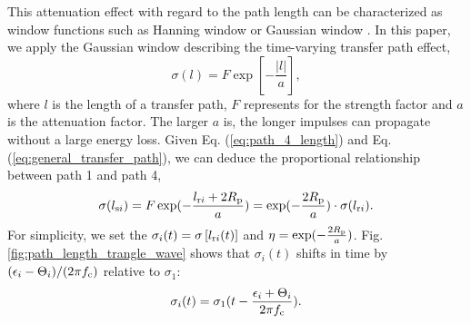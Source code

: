 \documentclass[a4paper,fleqn]{cas-sc}%
\begin{document}
\par This attenuation effect with regard to the path length can be characterized as window functions such as Hanning window or Gaussian window \cite{Mark2009}. In this paper, we apply the Gaussian window describing the time-varying transfer path effect,
\begin{equation}
    \sigma(l)=F\exp\left[-\frac{\left|l\right|}{a}\right],\label{eq:general_transfer_path}
\end{equation}
where $l$ is the length of a transfer path, $F$ represents for the strength factor and $a$ is the attenuation factor. The larger $a$ is, the longer impulses can propagate without a large energy loss. Given Eq. (\ref{eq:path_4_length}) and Eq. (\ref{eq:general_transfer_path}), we can deduce the proportional relationship between path 1 and path 4,
\begin{equation}
    \sigma (l_{{\rm s}i})=F\exp(-\frac{l_{{\rm r}i}+2 R_{\rm p}}{a})=\exp(-\frac{2 R_{\rm p}}{a}) \cdot \sigma(l_{{\rm r}i}).
\end{equation}
For simplicity, we set the $\sigma_i(t)=\sigma\left[l_{{\rm r}i}(t)\right]$ and $\eta=\exp(-\frac{2 R_{\rm p}}{a})$. Fig. \ref{fig:path_length_trangle_wave} shows that $\sigma_{i}(t)$ shifts in time by $(\epsilon_i-\Theta_i)/(2 \pi f_{\rm c})$ relative to $\sigma_1$:
\begin{equation}
    \sigma_{i}(t)=\sigma_{1}(t-\frac{\epsilon_i+\Theta_i}{2 \pi f_{\rm c}}).
\end{equation}
\end{document}
